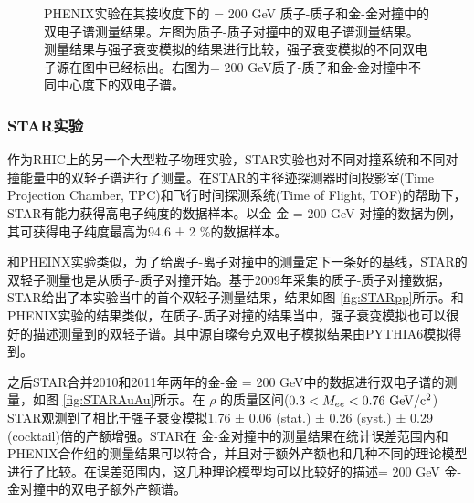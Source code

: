 \begin{figure}[htb]
\begin{subfigure}[b]{0.45\textwidth}
        \caption{}
        \label{fig:PHENIXAuAu}
    \end{subfigure}
    \caption[PHENIX实验 \sNN = 200 GeV 质子-质子和金-金对撞中的双电子谱测量结果]{PHENIX实验在其接收度下的 \sNN = 200 GeV 质子-质子和金-金对撞中的双电子谱测量结果。左图为质子-质子对撞中的双电子谱测量结果。测量结果与强子衰变模拟的结果进行比较，强子衰变模拟的不同双电子源在图中已经标出。右图为\sNN = 200 GeV质子-质子和金-金对撞中不同中心度下的双电子谱。}
       \label{fig:PHENIXDiElectron}
\end{figure}

\subsubsection{STAR实验}

作为RHIC上的另一个大型粒子物理实验，STAR实验也对不同对撞系统和不同对撞能量中的双轻子谱进行了测量。在STAR的主径迹探测器时间投影室(Time Projection Chamber, TPC)和飞行时间探测系统(Time of Flight, TOF)的帮助下，STAR有能力获得高电子纯度的数据样本。以金-金 \sNN = 200 GeV 对撞的数据为例，其可获得电子纯度最高为94.6 ± 2 \%的数据样本。

和PHEINX实验类似，为了给离子-离子对撞中的测量定下一条好的基线，STAR的双轻子测量也是从质子-质子对撞开始。基于2009年采集的质子-质子对撞数据，STAR给出了本实验当中的首个双轻子测量结果，结果如图 \ref{fig:STARpp}所示。和PHENIX实验的结果类似，在质子-质子对撞的结果当中，强子衰变模拟也可以很好的描述测量到的双轻子谱。其中源自璨夸克双电子模拟结果由PYTHIA6模拟得到。

之后STAR合并2010和2011年两年的金-金 \sNN = 200 GeV中的数据进行双电子谱的测量，如图 \ref{fig:STARAuAu}所示。在 $\rho$ 的质量区间($0.3 < M_{ee} < 0.76 ~{\rm GeV/c^2}$) STAR观测到了相比于强子衰变模拟1.76 ± 0.06 (stat.) ± 0.26 (syst.) ± 0.29 (cocktail)倍的产额增强。STAR在 \sNNerbai 金-金对撞中的测量结果在统计误差范围内和PHENIX合作组的测量结果可以符合，并且对于额外产额也和几种不同的理论模型进行了比较。在误差范围内，这几种理论模型均可以比较好的描述\sNN = 200 GeV 金-金对撞中的双电子额外产额谱。

